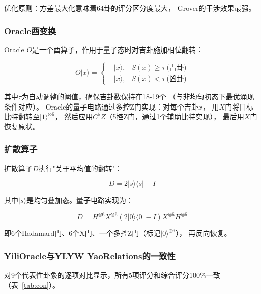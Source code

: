 \documentclass[twocolumn]{article}
\begin{document}
\noindent 优化原则：方差最大化意味着64卦的评分区分度最大，
Grover的干涉效果最强。

\subsubsection{Oracle酉变换}

Oracle $O$是一个酉算子，作用于量子态时对吉卦施加相位翻转：

\begin{equation}
    O |x\rangle = \begin{cases}
        -|x\rangle, & S(x) \geq \tau\ \text{(吉卦)}\\
        +|x\rangle, & S(x) < \tau\ \text{(凶卦)}
    \end{cases}
\end{equation}

\noindent 其中$\tau$为自动调整的阈值，确保吉卦数保持在18-19个
（与非均匀初态下最优涌现条件对应）。
Oracle的量子电路通过多控Z门实现：对每个吉卦$x$，
用$X$门将目标比特翻转至$|1\rangle^{\otimes 6}$，
然后应用$C^5Z$（5控Z门，通过1个辅助比特实现），
最后用$X$门恢复原状。

\subsubsection{扩散算子}

扩散算子$D$执行"关于平均值的翻转"：

\begin{equation}
    D = 2|s\rangle\langle s| - I
\end{equation}

\noindent 其中$|s\rangle$是均匀叠加态。量子电路实现为：

\begin{equation}
    D = H^{\otimes 6} X^{\otimes 6} (2|0\rangle\langle 0| - I) X^{\otimes 6} H^{\otimes 6}
\end{equation}

\noindent 即6个Hadamard门、6个X门、一个多控Z门（标记$|0\rangle^{\otimes 6}$），
再反向恢复。

\subsubsection{YiliOracle与YLYW YaoRelations的一致性}

对9个代表性卦象的逐项对比显示，所有5项评分和综合评分100\%一致（表~\ref{tab:con}）。
\end{document}
